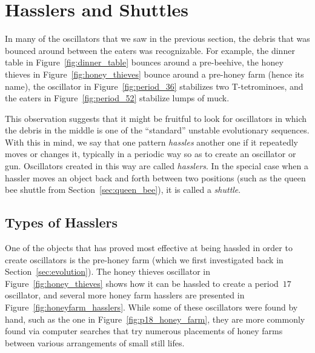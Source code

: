 \section{Hasslers and Shuttles}\label{sec:hasslers}

In many of the oscillators that we saw in the previous section, the debris that was bounced around between the eaters was recognizable. For example, the dinner table in Figure~\ref{fig:dinner_table} bounces around a pre-beehive, the honey thieves in Figure~\ref{fig:honey_thieves} bounce around a pre-honey farm (hence its name), the oscillator in Figure~\ref{fig:period_36} stabilizes two T-tetrominoes, and the eaters in Figure~\ref{fig:period_52} stabilize lumps of muck.

This observation suggests that it might be fruitful to look for oscillators in which the debris in the middle is one of the ``standard'' unstable evolutionary sequences. With this in mind, we say that one pattern \emph{hassles} another one if it repeatedly moves or changes it, typically in a periodic way so as to create an oscillator or gun. Oscillators created in this way are called \emph{hasslers}. In the special case when a hassler moves an object back and forth between two positions (such as the queen bee shuttle from Section~\ref{sec:queen_bee}), it is called a \emph{shuttle}.



\subsection{Types of Hasslers}\label{sec:hassler_types}

One of the objects that has proved most effective at being hassled in order to create oscillators is the pre-honey farm (which we first investigated back in Section~\ref{sec:evolution}). The honey thieves oscillator in Figure~\ref{fig:honey_thieves} shows how it can be hassled to create a period~$17$ oscillator, and several more honey farm hasslers are presented in Figure~\ref{fig:honeyfarm_hasslers}. While some of these oscillators were found by hand, such as the one in Figure~\ref{fig:p18_honey_farm}, they are more commonly found via computer searches that try numerous placements of honey farms between various arrangements of small still lifes.

